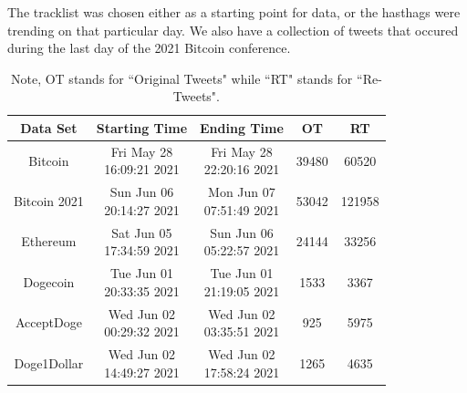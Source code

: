 \documentclass[a4paper,11pt]{article}
\begin{document}
The tracklist was chosen either as a starting point for data, or the hasthags were trending on that particular day.  We also have a collection of tweets that occured during the last day of the 2021 Bitcoin conference.

\begin{table}[h!]
    \centering
     \begin{tabular}{||c c c c c||} 
     \hline
     Data Set & Starting Time & Ending Time & OT & RT\\ [0.5ex] 
    \hline\hline
     Bitcoin & \makecell{Fri May 28 \\ 16:09:21 2021} & \makecell{Fri May 28 
     \\ 22:20:16 2021} &   39480 & 60520 \\ 
    \hline
    Bitcoin 2021 & \makecell{Sun Jun 06 \\ 20:14:27 2021} & \makecell{Mon Jun 07\\
     07:51:49 2021} &  53042 & 121958 \\ 
   \hline
     Ethereum & \makecell{Sat Jun 05 \\ 17:34:59 2021} & \makecell{Sun Jun 06 \\
      05:22:57 2021} & 24144 & 33256 \\
    \hline
    Dogecoin & \makecell{Tue Jun 01 \\ 20:33:35 2021} & \makecell{Tue Jun 01\\
     21:19:05 2021} & 1533 & 3367 \\
    \hline
     AcceptDoge & \makecell{Wed Jun 02 \\ 00:29:32 2021} & \makecell{Wed Jun 02
      \\ 03:35:51 2021} & 925 & 5975 \\
    \hline
     Doge1Dollar & \makecell{Wed Jun 02 \\ 14:49:27 2021} & \makecell{Wed Jun 02
      \\ 17:58:24 2021} & 1265 & 4635 \\
    \hline\hline
     \end{tabular}
\caption{Note, OT stands for ``Original Tweets" while ``RT" stands for ``Re-Tweets".}
\end{table}
\end{document}
